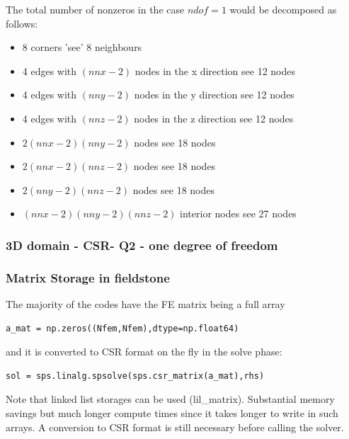 The total number of nonzeros in the case $ndof=1$ would be decomposed as follows:
\begin{itemize}
\item 8 corners 'see' 8 neighbours
\item 4 edges with $(nnx-2)$ nodes in the x direction see 12 nodes
\item 4 edges with $(nny-2)$ nodes in the y direction see 12 nodes
\item 4 edges with $(nnz-2)$ nodes in the z direction see 12 nodes
\item $2(nnx-2)(nny-2)$ nodes see 18 nodes
\item $2(nnx-2)(nnz-2)$ nodes see 18 nodes
\item $2(nny-2)(nnz-2)$ nodes see 18 nodes
\item $(nnx-2)(nny-2)(nnz-2)$ interior nodes see 27 nodes
\end{itemize}

\subsubsection{3D domain - CSR- Q2 - one degree of freedom}


\begin{center}

\end{center}





\subsubsection{Matrix Storage in fieldstone}

The majority of the codes have the FE matrix being a full array
\begin{lstlisting}
a_mat = np.zeros((Nfem,Nfem),dtype=np.float64) 
\end{lstlisting}
and it is converted to CSR format on the fly in the solve phase:
\begin{lstlisting}
sol = sps.linalg.spsolve(sps.csr_matrix(a_mat),rhs)
\end{lstlisting}

Note that linked list storages can be used (lil\_matrix). Substantial memory savings 
but much longer compute times since it takes longer to write in such arrays.
A conversion to CSR format is still necessary before calling the solver.




